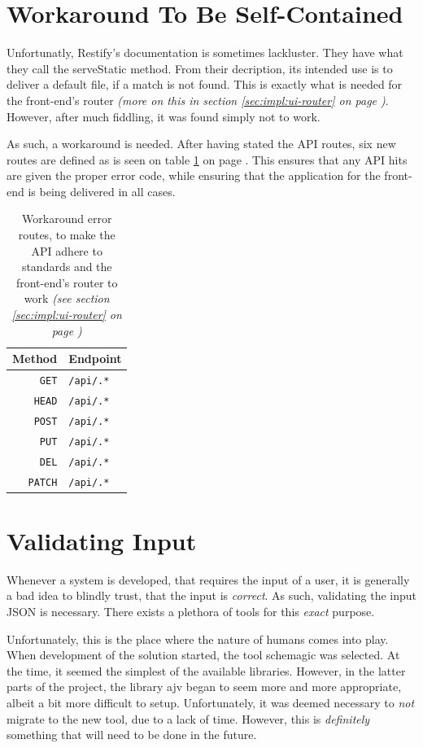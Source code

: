 	\section{Workaround To Be Self-Contained}
		Unfortunatly, Restify's documentation is sometimes lackluster. They have what they call the serveStatic method. From their decription, its intended use is to deliver a default file, if a match is not found. This is exactly what is needed for the front-end's router \emph{(more on this in section \ref{sec:impl:ui-router} on page \pageref{sec:impl:ui-router})}. However, after much fiddling, it was found simply not to work.

		As such, a workaround is needed. After having stated the API routes, six new routes are defined as is seen on table \ref{tab:api:workaround} on page \pageref{tab:api:workaround}. This ensures that any API hits are given the proper error code, while ensuring that the application for the front-end is being delivered in all cases.
		\begin{table}
			\centering
			\begin{tabular}{r | l}
				\textbf{Method} & \textbf{Endpoint} \\
				\hline
				\verb=GET=		& \verb=/api/.*= \\
				\verb=HEAD=		& \verb=/api/.*= \\	
				\verb=POST=		& \verb=/api/.*= \\	
				\verb=PUT=		& \verb=/api/.*= \\
				\verb=DEL=		& \verb=/api/.*= \\
				\verb=PATCH=	& \verb=/api/.*= \\	
			\end{tabular}
			\caption{Workaround error routes, to make the API adhere to standards and the front-end's router to work \emph{(see section \ref{sec:impl:ui-router} on page \pageref{sec:impl:ui-router})}}
			\label{tab:api:workaround}
		\end{table}

	\section{Validating Input}
		Whenever a system is developed, that requires the input of a user, it is generally a bad idea to blindly trust, that the input is \emph{correct}. As such, validating the input JSON is necessary. There exists a plethora of tools for this \emph{exact} purpose. 

		Unfortunately, this is the place where the nature of humans comes into play. When development of the solution started, the tool schemagic was selected. At the time, it seemed the simplest of the available libraries. However, in the latter parts of the project, the library ajv began to seem more and more appropriate, albeit a bit more difficult to setup. Unfortunately, it was deemed necessary to \emph{not} migrate to the new tool, due to a lack of time. However, this is \emph{definitely} something that will need to be done in the future.

